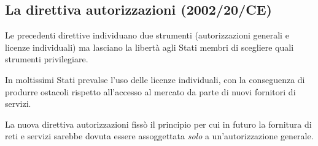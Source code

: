\subsection{La direttiva autorizzazioni (2002/20/CE)}

Le precedenti direttive individuano due strumenti (autorizzazioni generali e licenze individuali) ma lasciano la libertà agli Stati membri di scegliere quali strumenti privilegiare. 

In moltissimi Stati prevalse l'uso delle licenze individuali, con la conseguenza di produrre ostacoli rispetto all'accesso al mercato da parte di nuovi fornitori di servizi.


La nuova direttiva autorizzazioni fissò il principio per cui in futuro la fornitura di reti e servizi sarebbe dovuta essere assoggettata \textit{solo} a un'autorizzazione generale.